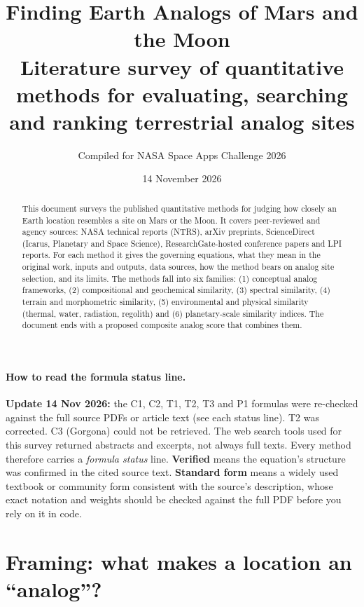 \documentclass[11pt,a4paper]{article}
\title{\color{navy}\textbf{Finding Earth Analogs of Mars and the Moon}\\[0.3em]
\large Literature survey of quantitative methods for evaluating, searching and ranking terrestrial analog sites}
\author{Compiled for NASA Space Apps Challenge 2026}
\date{14 November 2026}
\begin{document}
\maketitle
\thispagestyle{empty}

\begin{abstract}
\noindent This document surveys the published quantitative methods for judging how closely an Earth location resembles a site on Mars or the Moon. It covers peer-reviewed and agency sources: NASA technical reports (NTRS), arXiv preprints, ScienceDirect (Icarus, Planetary and Space Science), ResearchGate-hosted conference papers and LPI reports. For each method it gives the governing equations, what they mean in the original work, inputs and outputs, data sources, how the method bears on analog site selection, and its limits. The methods fall into six families: (1) conceptual analog frameworks, (2) compositional and geochemical similarity, (3) spectral similarity, (4) terrain and morphometric similarity, (5) environmental and physical similarity (thermal, water, radiation, regolith) and (6) planetary-scale similarity indices. The document ends with a proposed composite analog score that combines them.
\end{abstract}

\paragraph{How to read the formula status line.} \textbf{Update 14 Nov 2026:} the C1, C2, T1, T2, T3 and P1 formulas were re-checked against the full source PDFs or article text (see each status line). T2 was corrected. C3 (Gorgona) could not be retrieved. The web search tools used for this survey returned abstracts and excerpts, not always full texts. Every method therefore carries a \emph{formula status} line. \textbf{Verified} means the equation's structure was confirmed in the cited source text. \textbf{Standard form} means a widely used textbook or community form consistent with the source's description, whose exact notation and weights should be checked against the full PDF before you rely on it in code.

\tableofcontents
\newpage

\section{Framing: what makes a location an ``analog''?}
\end{document}
